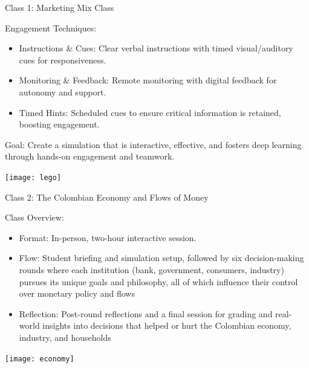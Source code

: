 \documentclass[
  ignorenonframetext,
]{beamer}
\providecommand{\tightlist}{%
  \setlength{\itemsep}{0pt}\setlength{\parskip}{0pt}}
\begin{document}
\begin{frame}{Class 1: Marketing Mix Class}
\label{class-1-marketing-mix-class-2}
\small

Engagement Techniques:

\begin{itemize}
\tightlist
\item
  Instructions \& Cues: Clear verbal instructions with timed
  visual/auditory cues for responsiveness.
\item
  Monitoring \& Feedback: Remote monitoring with digital feedback for
  autonomy and support.
\item
  Timed Hints: Scheduled cues to ensure critical information is
  retained, boosting engagement.
\end{itemize}

Goal: Create a simulation that is interactive, effective, and fosters
deep learning through hands-on engagement and teamwork.

\begin{flushleft}\texttt{[image: lego]} \end{flushleft}
\end{frame}

\begin{frame}{Class 2: The Colombian Economy and Flows of Money}
\label{class-2-the-colombian-economy-and-flows-of-money}
\small

Class Overview:

\begin{itemize}
\tightlist
\item
  Format: In-person, two-hour interactive session.
\item
  Flow: Student briefing and simulation setup, followed by six
  decision-making rounds where each institution (bank, government,
  consumers, industry) pursues its unique goals and philosophy, all of
  which influence their control over monetary policy and flows
\item
  Reflection: Post-round reflections and a final session for grading and
  real-world insights into decisions that helped or hurt the Colombian
  economy, industry, and households
\end{itemize}

\begin{flushleft}\texttt{[image: economy]} \end{flushleft}
\end{frame}
\end{document}
